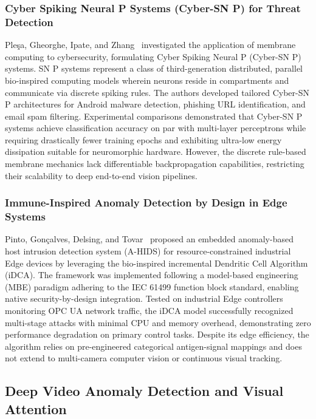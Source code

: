 \documentclass[12pt,a4paper]{report}
\begin{document}
\subsubsection{Cyber Spiking Neural P Systems (Cyber-SN P) for Threat Detection}
Ple{\c{s}}a, Gheorghe, Ipate, and Zhang~\cite{ref_plesa2024_snp} investigated the application of membrane computing to cybersecurity, formulating Cyber Spiking Neural P (Cyber-SN P) systems. SN P systems represent a class of third-generation distributed, parallel bio-inspired computing models wherein neurons reside in compartments and communicate via discrete spiking rules. The authors developed tailored Cyber-SN P architectures for Android malware detection, phishing URL identification, and email spam filtering. Experimental comparisons demonstrated that Cyber-SN P systems achieve classification accuracy on par with multi-layer perceptrons while requiring drastically fewer training epochs and exhibiting ultra-low energy dissipation suitable for neuromorphic hardware. However, the discrete rule-based membrane mechanics lack differentiable backpropagation capabilities, restricting their scalability to deep end-to-end vision pipelines.

\subsubsection{Immune-Inspired Anomaly Detection by Design in Edge Systems}
Pinto, Gon{\c{c}}alves, Delsing, and Tovar~\cite{ref_pinto2022_dca} proposed an embedded anomaly-based host intrusion detection system (A-HIDS) for resource-constrained industrial Edge devices by leveraging the bio-inspired incremental Dendritic Cell Algorithm (iDCA). The framework was implemented following a model-based engineering (MBE) paradigm adhering to the IEC 61499 function block standard, enabling native security-by-design integration. Tested on industrial Edge controllers monitoring OPC UA network traffic, the iDCA model successfully recognized multi-stage attacks with minimal CPU and memory overhead, demonstrating zero performance degradation on primary control tasks. Despite its edge efficiency, the algorithm relies on pre-engineered categorical antigen-signal mappings and does not extend to multi-camera computer vision or continuous visual tracking.

\subsection{Deep Video Anomaly Detection and Visual Attention}
\end{document}

